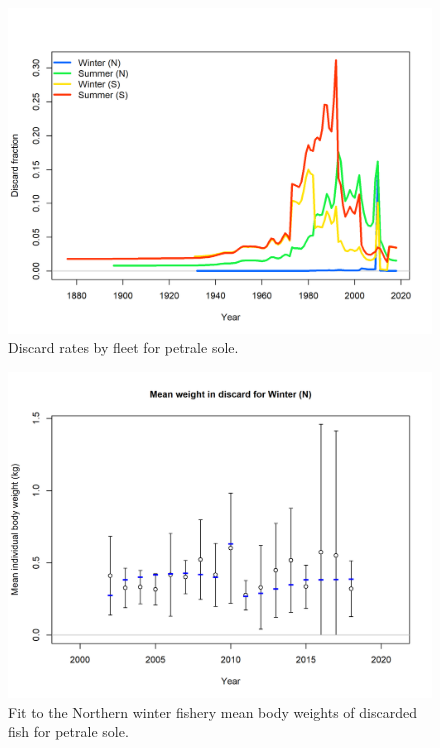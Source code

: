 \documentclass[12pt,]{article}
\begin{document}
\FloatBarrier

\begin{figure}
\centering
\includegraphics{r4ss/plots_mod1/catch8 discard fraction.png}
\caption{Discard rates by fleet for petrale sole. \label{fig:Discard}}
\end{figure}

\FloatBarrier

\begin{figure}
\centering
\includegraphics{r4ss/plots_mod1/bodywt_fit_fltWinter (N).png}
\caption{Fit to the Northern winter fishery mean body weights of
discarded fish for petrale sole. \label{fig:nw_bodywt_fit}}
\end{figure}
\end{document}
